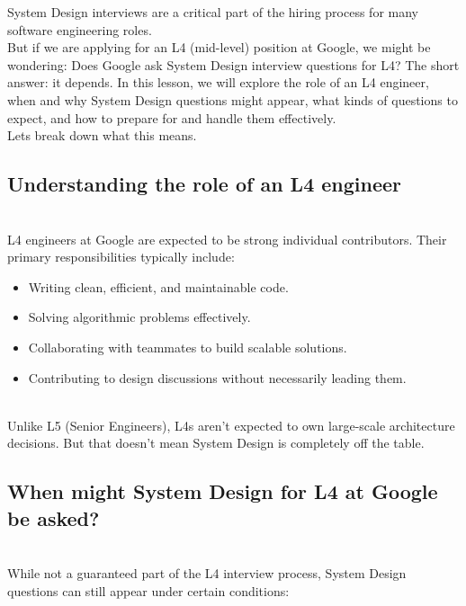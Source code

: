 

System Design interviews are a critical part of the hiring process for many software engineering roles.
\\
But if we are applying for an L4 (mid-level) position at Google, we might be wondering: Does Google ask System Design interview questions for L4? The short answer: it depends. In this lesson, we will explore the role of an L4 engineer, when and why System Design questions might appear, what kinds of questions to expect, and how to prepare for and handle them effectively.
\\
Let\textquotesingle s break down what this means.

\subsection{Understanding the role of an L4 engineer}\label{UAMuSW0daYomrOyY-y1lP}
\\
L4 engineers at Google are expected to be strong individual contributors. Their primary responsibilities typically include:

\begin{itemize}
\item
\protect{}\label{8-Dm9QG3xds1ZmdNYqUPM}
Writing clean, efficient, and maintainable code.
\item
\protect{}\label{ruVLz8rvHWGI0PKL22-79}
Solving algorithmic problems effectively.
\item
\protect{}\label{_pLYapcwa3T7mUA76SX5v}
Collaborating with teammates to build scalable solutions.
\item
\protect{}\label{fs0ajSHBSGkkwTplO8tMD}
Contributing to design discussions without necessarily leading them.
\end{itemize}
\\
Unlike L5 (Senior Engineers), L4s aren't expected to own large-scale architecture decisions. But that doesn't mean System Design is completely off the table.

\subsection{When might System Design for L4 at Google be asked?}\label{io-jvk9G3xNSSJk5mvmaD}
\\
While not a guaranteed part of the L4 interview process, System Design questions can still appear under certain conditions:

